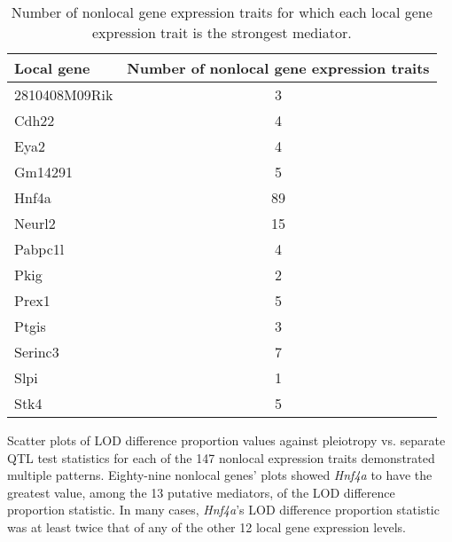 \documentclass{book}
\begin{document}
\begin{table}[ht]
\centering
\begin{tabular}{lc}
  \hline
 Local gene & Number of nonlocal gene expression traits \\
  \hline
2810408M09Rik &   3 \\
  Cdh22 &   4 \\
  Eya2 &   4 \\
  Gm14291 &   5 \\
  Hnf4a &  89 \\
  Neurl2 &  15 \\
  Pabpc1l &   4 \\
  Pkig &   2 \\
  Prex1 &   5 \\
  Ptgis &   3 \\
  Serinc3 &   7 \\
  Slpi &   1 \\
  Stk4 &   5 \\
   \hline
\end{tabular}
\caption{Number of nonlocal gene expression traits for which each local gene expression trait is the strongest mediator.}
\label{tab:med-count}
\end{table}


Scatter plots of LOD difference proportion values against pleiotropy vs. separate QTL test statistics for each of the 147 nonlocal expression traits demonstrated multiple patterns. Eighty-nine nonlocal genes' plots showed \emph{Hnf4a} to have the greatest value, among the 13 putative mediators, of the LOD difference proportion statistic. In many cases, \emph{Hnf4a}'s LOD difference proportion statistic was at least twice that of any of the other 12 local gene expression levels.
\end{document}
